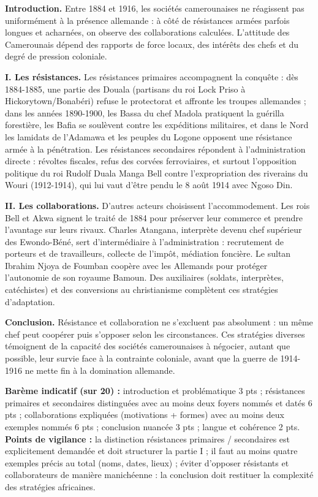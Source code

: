 \documentclass[11pt]{article}
\begin{document}
\begin{corrige}
\textbf{Introduction.} Entre 1884 et 1916, les sociétés camerounaises ne réagissent pas uniformément à la présence allemande : à côté de résistances armées parfois longues et acharnées, on observe des collaborations calculées. L'attitude des Camerounais dépend des rapports de force locaux, des intérêts des chefs et du degré de pression coloniale.

\textbf{I. Les résistances.} Les résistances primaires accompagnent la conquête : dès 1884-1885, une partie des Douala (partisans du roi Lock Priso à Hickorytown/Bonabéri) refuse le protectorat et affronte les troupes allemandes ; dans les années 1890-1900, les Bassa du chef Madola pratiquent la guérilla forestière, les Bafia se soulèvent contre les expéditions militaires, et dans le Nord les lamidats de l'Adamawa et les peuples du Logone opposent une résistance armée à la pénétration. Les résistances secondaires répondent à l'administration directe : révoltes fiscales, refus des corvées ferroviaires, et surtout l'opposition politique du roi Rudolf Duala Manga Bell contre l'expropriation des riverains du Wouri (1912-1914), qui lui vaut d'être pendu le 8 août 1914 avec Ngoso Din.

\textbf{II. Les collaborations.} D'autres acteurs choisissent l'accommodement. Les rois Bell et Akwa signent le traité de 1884 pour préserver leur commerce et prendre l'avantage sur leurs rivaux. Charles Atangana, interprète devenu chef supérieur des Ewondo-Béné, sert d'intermédiaire à l'administration : recrutement de porteurs et de travailleurs, collecte de l'impôt, médiation foncière. Le sultan Ibrahim Njoya de Foumban coopère avec les Allemands pour protéger l'autonomie de son royaume Bamoun. Des auxiliaires (soldats, interprètes, catéchistes) et des conversions au christianisme complètent ces stratégies d'adaptation.

\textbf{Conclusion.} Résistance et collaboration ne s'excluent pas absolument : un même chef peut coopérer puis s'opposer selon les circonstances. Ces stratégies diverses témoignent de la capacité des sociétés camerounaises à négocier, autant que possible, leur survie face à la contrainte coloniale, avant que la guerre de 1914-1916 ne mette fin à la domination allemande.

\textbf{Barème indicatif (sur 20) :} introduction et problématique 3 pts ; résistances primaires et secondaires distinguées avec au moins deux foyers nommés et datés 6 pts ; collaborations expliquées (motivations + formes) avec au moins deux exemples nommés 6 pts ; conclusion nuancée 3 pts ; langue et cohérence 2 pts.
\textbf{Points de vigilance :} la distinction résistances primaires / secondaires est explicitement demandée et doit structurer la partie I ; il faut au moins quatre exemples précis au total (noms, dates, lieux) ; éviter d'opposer résistants et collaborateurs de manière manichéenne : la conclusion doit restituer la complexité des stratégies africaines.
\end{corrige}
\end{document}
